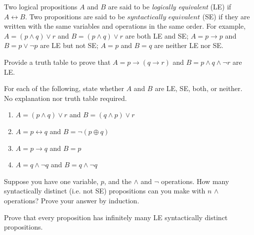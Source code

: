\documentclass[solution, letterpaper]{cs20}
\begin{document}

Two logical propositions $A$ and $B$ are said to be \textit{logically equivalent} (LE) if $A \leftrightarrow B$. Two propositions are said to be $\textit{syntactically equivalent}$ (SE) if they are written with the same variables and operations in the same order. For example, $A = (p \land q) \lor r$ and $B = (p \land q) \lor r$ are both LE and SE; $A  = p \to p$ and $B = p \lor \neg p$ are LE but not SE; $A = p$ and $B = q$ are neither LE nor SE.

\subproblem Provide a truth table to prove that $A  = p \to (q \to r)$ and $B = p \land q \land \neg r$ are LE.

\subproblem For each of the following, state whether $A$ and $B$ are LE, SE, both, or neither. No explanation nor truth table required.

\begin{enumerate}
\item $A = (p \land q) \lor r$ and $B = (q \land p) \lor r$
\item $A = p \leftrightarrow q$ and $B = \neg (p \oplus q)$
\item $A = p \to q$ and $B = p$
\item $A = q \land \neg q$ and $B = q \land \neg q$
\end{enumerate}

\subproblem Suppose you have one variable, $p$, and the $\land$ and $\neg$ operations. How many syntactically distinct (i.e. not SE) propositions can you make with $n$ $\land$ operations? Prove your answer by induction.

\subproblem Prove that every proposition has infinitely many LE syntactically distinct propositions.
\end{document}
